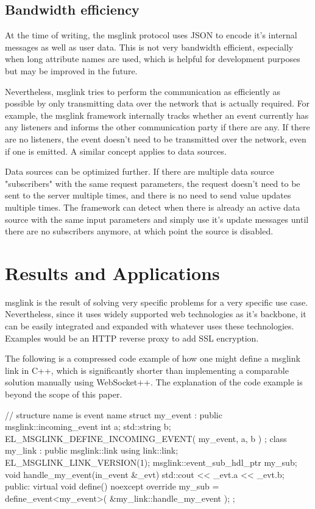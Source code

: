 \documentclass[conference]{IEEEtran}
\begin{document}
\subsection{Bandwidth efficiency}

At the time of writing, the msglink protocol uses JSON to encode it's internal messages as well as user data. This is not very bandwidth efficient, especially when long attribute names are used, which is helpful for development purposes but may be improved in the future. 

Nevertheless, msglink tries to perform the communication as efficiently as possible by only transmitting data over the network that is actually required. For example, the msglink framework internally tracks whether an event currently has any listeners and informs the other communication party if there are any. If there are no listeners, the event doesn't need to be transmitted over the network, even if one is emitted. A similar concept applies to data sources.

Data sources can be optimized further. If there are multiple data source "subscribers" with the same request parameters, the request doesn't need to be sent to the server multiple times, and there is no need to send value updates multiple times. The framework can detect when there is already an active data source with the same input parameters and simply use it's update messages until there are no subscribers anymore, at which point the source is disabled.

\section{Results and Applications}

msglink is the result of solving very specific problems for a very specific use case. Nevertheless, since it uses widely supported web technologies as it's backbone, it can be easily integrated and expanded with whatever uses these technologies. Examples would be an HTTP reverse proxy to add SSL encryption.

The following is a compressed code example of how one might define a msglink link in C++, which is significantly shorter than implementing a comparable solution manually using WebSocket++. The explanation of the code example is beyond the scope of this paper.

\begin{code-cpp}
// structure name is event name
struct my_event 
    : public msglink::incoming_event {
    int a;
    std::string b;
    EL_MSGLINK_DEFINE_INCOMING_EVENT(
        my_event, a, b
    )
};
class my_link : public msglink::link {
    using link::link;
    EL_MSGLINK_LINK_VERSION(1);
    msglink::event_sub_hdl_ptr my_sub;
    void handle_my_event(in_event &_evt) {
        std::cout << _evt.a << _evt.b;
    }
public:
    virtual void define() noexcept override {
        my_sub = define_event<my_event>(
            &my_link::handle_my_event
        );
    }
};
\end{code-cpp}
\end{document}

